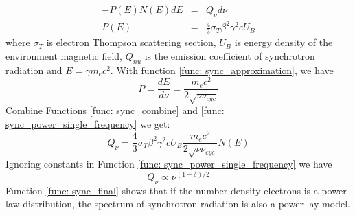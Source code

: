 \documentclass[12pt]{report}
\newcommand{\add}[1]{
  $<$\colorbox{red}{\textbf{add}}$>$#1$<$\colorbox{red}{\textbf{/add}}$>$
}
\begin{document}
            \begin{eqnarray}
              \label{func: sync_power_single_frequency}
              -P\left(E\right)N\left(E\right)dE &=& Q_{\nu} d\nu\\
              P\left(E\right) &=& \frac{4}{3} \sigma_{T} \beta^2 \gamma^2 c U_B
            \end{eqnarray} 
            where $\sigma_{T}$ is electron Thompson scattering section, $U_B$ is energy density of 
            the environment magnetic field,  $Q_{nu}$ is the emission coefficient of synchrotron radiation 
            and $E=\gamma m_e c^2$. With function \ref{func: sync_approximation}, we have
            \begin{equation}
              \label{func: sync_combine}
              P = \frac{dE}{d\nu} = \frac{m_e c^2}{2\sqrt{\nu \nu_{cyc}}}
            \end{equation}
            Combine Functions \ref{func: sync_combine} and \ref{func: sync_power_single_frequency} we get:
            \begin{equation}
              Q_{\nu} = \frac{4}{3} \sigma_{T} \beta^2 \gamma^2 c U_B \frac{m_e c^2}{2\sqrt{\nu \nu_{cyc}}} N\left(E\right)
            \end{equation}
            Ignoring constants in Function \ref{func: sync_power_single_frequency} we have 
            \begin{equation}
              \label{func: sync_final}
              Q_{\nu} \propto \nu^{(1-\delta)/2}
            \end{equation}
            Function \ref{func: sync_final} shows that if the number density electrons is a power-law 
            distribution, the spectrum of synchrotron radiation is also a power-lay model.  
  
            
\end{document}

